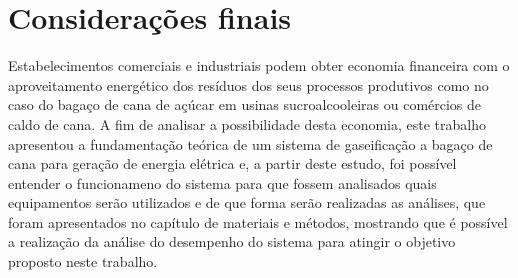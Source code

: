 \chapter[Considerações Finais]{Considerações finais}

Estabelecimentos comerciais e industriais podem obter economia financeira com o aproveitamento energético dos resíduos dos seus processos produtivos como no caso do bagaço de cana de açúcar em usinas sucroalcooleiras ou comércios de caldo de cana. A fim de analisar a possibilidade desta economia, este trabalho apresentou a fundamentação teórica de um sistema de gaseificação a bagaço de cana para geração de energia elétrica e, a partir deste estudo, foi possível entender o funcionameno do sistema para que fossem analisados quais equipamentos serão utilizados e de que forma serão realizadas as análises, que foram apresentados no capítulo de materiais e métodos, mostrando que é possível a realização da análise do desempenho do sistema para atingir o objetivo proposto neste trabalho.



